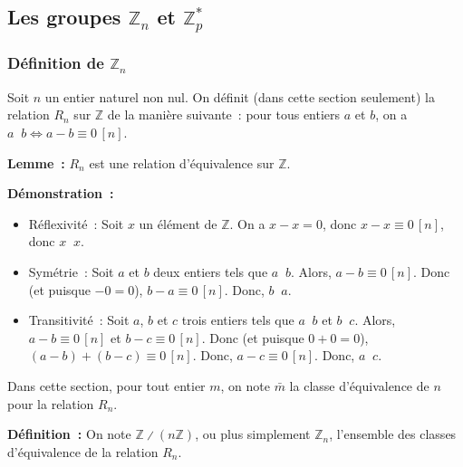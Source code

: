 \subsection{Les groupes \texorpdfstring{$\mathbb{Z}_n$}{Zn} et \texorpdfstring{$\mathbb{Z}_p^*$}{Zp*}}

\subsubsection{Définition de \texorpdfstring{$\mathbb{Z}_n$}{Zn}}

Soit $n$ un entier naturel non nul. 
On définit (dans cette section seulement) la relation $R_n$ sur $\mathbb{Z}$ de la manière suivante : pour tous entiers $a$ et $b$, on a $a \mathop{R_n} b \Leftrightarrow a - b \equiv 0 \, [n]$.

\medskip

\noindent\textbf{Lemme :} $R_n$ est une relation d'équivalence sur $\mathbb{Z}$. 

\medskip

\noindent\textbf{Démonstration :} 
\begin{itemize}[nosep]
    \item Réflexivité : Soit $x$ un élément de $\mathbb{Z}$. 
        On a $x - x = 0$, donc $x - x \equiv 0 \, [n]$, donc $x \mathop{R_n} x$.
    \item Symétrie : Soit $a$ et $b$ deux entiers tels que $a \mathop{R_n} b$.
        Alors, $a - b \equiv 0 \, [n]$.
        Donc (et puisque $-0 = 0$), $b - a \equiv 0 \, [n]$.
        Donc, $b \mathop{R_n} a$.
    \item Transitivité : Soit $a$, $b$ et $c$ trois entiers tels que $a \mathop{R_n} b$ et $b \mathop{R_n} c$.
        Alors, $a - b \equiv 0 \, [n]$ et $b - c \equiv 0 \, [n]$.
        Donc (et puisque $0 + 0 = 0$), $(a - b) + (b - c) \equiv 0 \, [n]$.
        Donc, $a - c \equiv 0 \, [n]$.
        Donc, $a \mathop{R_n} c$.
\end{itemize}

\done

\medskip

Dans cette section, pour tout entier $m$, on note $\bar{m}$ la classe d'équivalence de $n$ pour la relation $R_n$.

\medskip

\noindent\textbf{Définition :} On note $\mathbb{Z} \divslash (n \mathbb{Z})$, ou plus simplement $\mathbb{Z}_n$, l'ensemble des classes d'équivalence de la relation $R_n$.

\medskip

